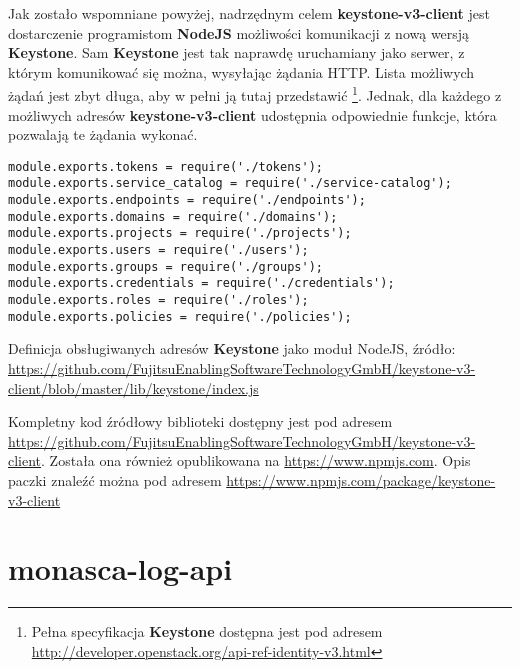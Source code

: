 Jak zostało wspomniane powyżej, nadrzędnym celem \textbf{keystone-v3-client} jest dostarczenie programistom \textbf{NodeJS} możliwości
komunikacji z nową wersją \textbf{Keystone}. Sam \textbf{Keystone} jest tak naprawdę uruchamiany jako serwer, z którym komunikować się można,
wysyłając żądania HTTP. Lista możliwych żądań jest zbyt długa, aby w pełni ją tutaj przedstawić 
\footnote{Pełna specyfikacja \textbf{Keystone} dostępna jest pod adresem \url{http://developer.openstack.org/api-ref-identity-v3.html}}. Jednak,
dla każdego z możliwych adresów \textbf{keystone-v3-client} udostępnia odpowiednie funkcje, która pozwalają te żądania wykonać.
    \begin{listing}
        \begin{verbatim}
module.exports.tokens = require('./tokens');
module.exports.service_catalog = require('./service-catalog');
module.exports.endpoints = require('./endpoints');
module.exports.domains = require('./domains');
module.exports.projects = require('./projects');
module.exports.users = require('./users');
module.exports.groups = require('./groups');
module.exports.credentials = require('./credentials');
module.exports.roles = require('./roles');
module.exports.policies = require('./policies');
        \end{verbatim}
        \caption[Definicja obsługiwanych adresów \textbf{Keystone}]{
            Definicja obsługiwanych adresów \textbf{Keystone} jako moduł NodeJS, źródło: \url{https://github.com/FujitsuEnablingSoftwareTechnologyGmbH/keystone-v3-client/blob/master/lib/keystone/index.js}}
        \label{chapter:application_own:own_work:keystone_v3_client:endpoints}
    \end{listing}

Kompletny kod źródłowy biblioteki dostępny jest pod adresem \url{https://github.com/FujitsuEnablingSoftwareTechnologyGmbH/keystone-v3-client}.
Została ona również opublikowana na \url{https://www.npmjs.com}. 
Opis paczki znaleźć można pod adresem \url{https://www.npmjs.com/package/keystone-v3-client}

\section{monasca-log-api}

